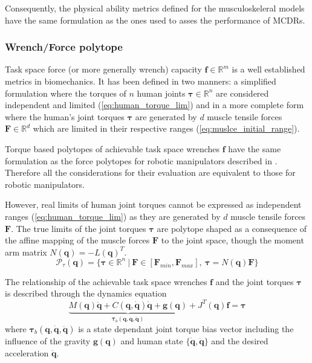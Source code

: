 Consequently, the physical ability metrics defined for the musculoskeleral models have the same formulation as the ones used to asses the performance of MCDRs.

\subsubsection{Wrench/Force polytope}
\label{ch:force_poly_human}
Task space force (or more generally wrench) capacity $\bm{f} \in \mathbb{R}^m$ is a well established metrics in biomechanics. It has been defined in two manners: a simplified formulation where the torques of $n$ human joints $\bm{\tau} \in \mathbb{R}^n$ are considered independent and limited (\ref{eq:human_torque_lim}) and in a more complete form where the human's joint torques $\bm{\tau}$ are generated by $d$ muscle tensile forces $\bm{F} \in \mathbb{R}^d$ which are limited in their respective ranges (\ref{eq:muslce_initial_range}).

Torque based polytopes \cite{rezzoug_application_2012,sasaki2011vertex} of achievable task space wrenches $\bm{f}$ have the same formulation as the force polytopes for robotic manipulators described in . Therefore all the considerations for their evaluation are equivalent to those for robotic manipulators.  

However, real limits of human joint torques cannot be expressed as independent ranges (\ref{eq:human_torque_lim}) as they are generated by $d$ muscle tensile forces $\bm{F}$. The true limits of the joint torques $\bm{\tau}$ are polytope shaped as a consequence of the affine mapping of the muscle forces $\bm{F}$ to the joint space, though the moment arm matrix $N(\bm{q})=-L(\bm{q})^T$.
\begin{equation}
\mathcal{P}_\tau(\bm{q}) = \{\bm{\tau} \in \mathbb{R}^n ~|~\bm{F}\in [\bm{F}_{min}, \bm{F}_{max}], ~\bm{\tau}=N(\bm{q})\bm{F}\}
\label{eq:poly_torque_human}
\end{equation}

The relationship of the achievable task space wrenches $\bm{f}$ and the joint torques $\bm{\tau}$ is described through the dynamics equation 
\begin{equation}
\underbrace{M(\bm{q})\ddot{\bm{q}} + C(\bm{q},\dot{\bm{q}})\dot{\bm{q}} + \bm{g}(\bm{q})}_{\bm{\tau}_b(\bm{q},\dot{\bm{q}},\ddot{\bm{q}})} + J^T(\bm{q})\bm{f} = \bm{\tau} 
\end{equation}
where $\bm{\tau}_b(\bm{q},\dot{\bm{q}},\ddot{\bm{q}})$ is a state dependant joint torque bias vector including the influence of the gravity $\bm{g}(\bm{q})$ and human state $\{\dot{\bm{q}},\ddot{\bm{q}}\}$ and the desired acceleration $\ddot{\bm{q}}$. 

